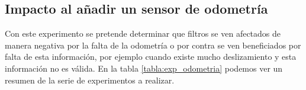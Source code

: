 \subsection{Impacto al añadir un sensor de odometría}
%
%
%
Con este experimento se pretende determinar que filtros se ven afectados de manera negativa por la falta de la odometría o por contra se ven beneficiados por falta de esta información, por ejemplo cuando existe mucho deslizamiento y esta información no es válida.
%
%
%
%
%
En la tabla \ref{tabla:exp_odometria} podemos ver un resumen de la serie de experimentos a realizar.

